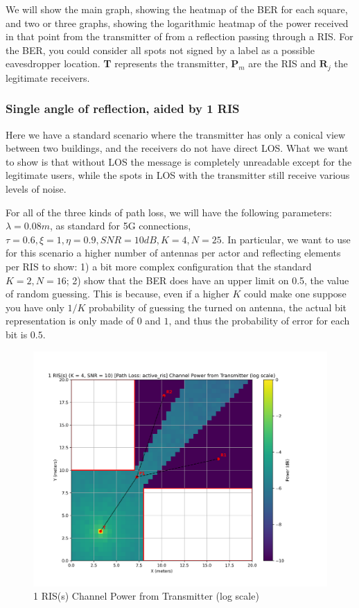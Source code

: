 \begin{itemize}
\end{itemize}

We will show the main graph, showing the heatmap of the BER for each square, and two or three graphs, showing the logarithmic heatmap of the power received in that point from the transmitter of from a reflection passing through a RIS. For the BER, you could consider all spots not signed by a label as a possible eavesdropper location. \textbf{T} represents the transmitter, $\bm{P}_m$ are the RIS and $\bm{R}_j$ the legitimate receivers.

\subsubsection{Single angle of reflection, aided by 1 RIS}

Here we have a standard scenario where the transmitter has only a conical view between two buildings, and the receivers do not have direct LOS. What we want to show is that without LOS the message is completely unreadable except for the legitimate users, while the spots in LOS with the transmitter still receive various levels of noise.

For all of the three kinds of path loss, we will have the following parameters: $\lambda = 0.08m$, as standard for 5G connections, $ \tau = 0.6, \xi = 1, \eta = 0.9, SNR = 10dB, K = 4, N = 25$. In particular, we want to use for this scenario a higher number of antennas per actor and reflecting elements per RIS to show: 1) a bit more complex configuration that the standard $K = 2, N = 16$; 2) show that the BER does have an upper limit on 0.5, the value of random guessing. This is because, even if a higher $K$ could make one suppose you have only $1/K$ probability of guessing the turned on antenna, the actual bit representation is only made of $0$ and $1$, and thus the probability of error for each bit is $0.5$.

\begin{figure}[H]
  \centering
  \includegraphics[width=0.7\linewidth]{imgs/heatmap-simulations/1 RIS(s) (K = 4, SNR = 10) [Path Loss_ active_ris] Channel Power from Transmitter (log scale).png}
  \caption{1 RIS(s) Channel Power from Transmitter (log scale)}
\end{figure}

